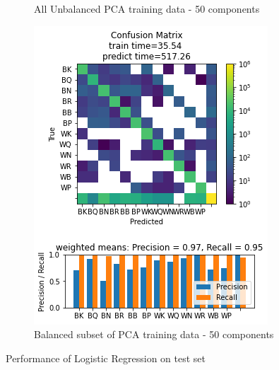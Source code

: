 \documentclass{article}
\newcommand{\FIGLABEL}[1]{Performance of #1 on test set}
\newcommand{\PCAFL}{All Unbalanced PCA training data - 50 components}
\newcommand{\PCABL}{Balanced subset of PCA training data - 50 components}
\begin{document}
\begin{figure}[h]
\begin{subfigure}{0.33\textwidth}
\caption{\PCAFL}
\end{subfigure}
\begin{subfigure}{0.33\textwidth}
\includegraphics[width=0.9\linewidth]{LR_B_PCA50c_160x160_evaluation.png} 
\caption{\PCABL}
\end{subfigure}
\caption{\FIGLABEL{Logistic Regression}}
\label{fig:LR}
\end{figure}
\end{document}
